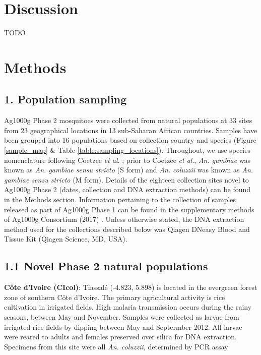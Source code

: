 \documentclass[a4paper,11pt,abstracton,hidelinks]{scrartcl}
\begin{document}
\section*{Discussion}

TODO


\section*{Methods}


\subsection*{1. Population sampling}

%
Ag1000g Phase 2 mosquitoes were collected from natural populations at 33 sites from 23
geographical locations in 13 sub-Saharan African countries. 
%
Samples have been grouped into 16 populations based on collection country and species (Figure \ref{sample_map} \& Table \ref{table:sampling_locations}).
%
Throughout, we use species nomenclature following Coetzee \textit{et al}. \cite{Coetzee2013};	
%
prior to	 Coetzee	 \textit{et al}., \textit{An. gambiae} was known as \textit{An. gambiae sensu stricto} (S form) and \textit{An. coluzzii} was known as \textit{An. gambiae sensu stricto} (M form).
%
Details of the eighteen collection sites novel to Ag1000g Phase 2 (dates, collection and DNA extraction methods) can be found in the Methods section.
%
Information pertaining to the collection of samples released as part of Ag1000g Phase 1 can be found in the supplementary methods of Ag1000g Consortium (2017) \cite{Ag1000gConsortium2017}.
%
Unless otherwise stated, the DNA extraction method used for the collections described below was Qiagen DNeasy Blood and Tissue Kit (Qiagen Science, MD, USA).

\subsection*{1.1 Novel Phase 2 natural populations}
%
\textbf{C\^{o}te d'Ivoire (CIcol)}: Tiassal\'{e} (-4.823, 5.898) is located in the evergreen forest zone of southern C\^{o}te d'Ivoire.
%
The primary agricultural activity is rice cultivation in irrigated fields.
%
High malaria transmission occurs during the rainy seasons, between May and November.
%
Samples were collected as larvae from irrigated rice fields by dipping between May and Septermber 2012.
%
All larvae were reared to adults and females preserved over silica for DNA extraction.
%
Specimens from this site were all \textit{An. coluzzii}, determined by PCR assay \cite{Santolamazza2008}
\end{document}
